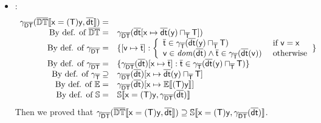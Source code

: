 \documentclass{llncs}
\begin{document}
\begin{lemma}
\begin{itemize}
\item {}: 
\[
\begin{array}{rl}
\gamma_{\mathsf{\overline{DT}}} (\mathbb{\overline{\mathit{\mathbb{DT}}}}\llbracket \mathtt{\mathsf{x = (T) y}, \mathsf{\overline{dt}}} \rrbracket)= &\\
\textrm{By def. of } \overline{\mathit{\mathbb{DT}}} = & \gamma_{\mathsf{\overline{DT}}} (\mathsf{\overline{dt}}[\mathsf{x} \mapsto \mathsf{\overline{dt}}(\mathsf{y}) \sqcap_{\mathsf{\overline{T}}} \mathsf{T}])\\
\textrm{By def. of } \gamma_{\mathsf{\overline{DT}}} = & \{[\mathsf{v} \mapsto \mathsf{\overline{t}}] : \left\{
\begin{array}{ll}
\mathsf{\overline{t}} \in \gamma_{\mathsf{\overline{T}}}(\mathsf{\overline{dt}}(\mathsf{y}) \sqcap_{\mathsf{\overline{T}}} \mathsf{T}) &\textrm{ if }\mathsf{v}=\mathsf{x} \\
\mathsf{v} \in \mathit{dom}(\mathsf{\overline{dt}}) \land \mathsf{\overline{t}} \in \gamma_{\mathsf{\overline{T}}}(\mathsf{\overline{dt}}(\mathsf{v})) &\textrm{ otherwise}
\end{array}
\right.
\}\\
\textrm{By def. of } \gamma_{\mathsf{\overline{DT}}} = & \{\gamma_{\mathsf{\overline{DT}}}(\mathsf{\overline{dt}})[\mathsf{x} \mapsto \mathsf{\overline{t}}] : \mathsf{\overline{t}} \in \gamma_{\mathsf{\overline{T}}}(\mathsf{\overline{dt}}(\mathsf{y}) \sqcap_{\mathsf{\overline{T}}} \mathsf{T})\}\\
\textrm{By def. of } \gamma_{\mathsf{\overline{T}}} \supseteq & \gamma_{\mathsf{\overline{DT}}}(\mathsf{\overline{dt}})[\mathsf{x} \mapsto \mathsf{\overline{dt}}(\mathsf{y}) \sqcap_{\mathsf{\overline{T}}} \mathsf{T}]\\
\textrm{By def. of }\mathit{\mathbb{E}} = & \gamma_{\mathsf{\overline{DT}}}(\mathsf{\overline{dt}})[\mathsf{x} \mapsto \mathbb{E}\llbracket \mathtt{\mathsf{(T) y}} \rrbracket]\\
\textrm{By def. of }\mathit{\mathbb{S}} = & \mathbb{S}\llbracket \mathtt{\mathsf{x = (T) y}, \gamma_{\mathsf{\overline{DT}}}(\mathsf{\overline{dt}})} \rrbracket\\
\end{array}
\]
Then we proved that $\gamma_{\mathsf{\overline{DT}}} (\mathbb{\overline{\mathit{\mathbb{DT}}}}\llbracket \mathtt{\mathsf{x = (T) y}, \mathsf{\overline{dt}}} \rrbracket) \supseteq \mathbb{S}\llbracket \mathtt{\mathsf{x = (T) y}, \gamma_{\mathsf{\overline{DT}}}(\mathsf{\overline{dt}})} \rrbracket$.


\end{itemize}
\end{lemma}
\end{document}
